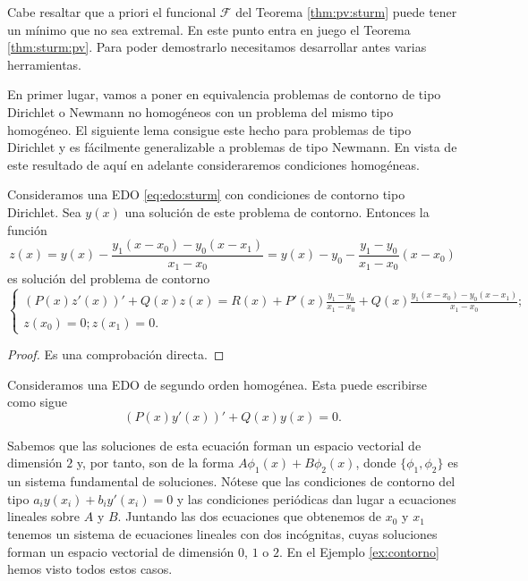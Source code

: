 \documentclass{article}
\begin{document}
Cabe resaltar que a priori el funcional $\mathcal{F}$ del Teorema \ref{thm:pv:sturm} puede tener un
mínimo que no sea extremal. En este punto entra en juego el Teorema \ref{thm:sturm:pv}. Para poder
demostrarlo necesitamos desarrollar antes varias herramientas.


En primer lugar, vamos a poner en equivalencia problemas de contorno de tipo Dirichlet o Newmann no
homogéneos con un problema del mismo tipo homogéneo. El siguiente lema consigue este hecho para
problemas de tipo Dirichlet y es fácilmente generalizable a problemas de tipo Newmann. En vista de
este resultado de aquí en adelante consideraremos condiciones homogéneas.


\begin{lemma} \label{lem:pc:hom} Consideramos una EDO \eqref{eq:edo:sturm} con condiciones de
  contorno tipo Dirichlet. Sea $y(x)$ una solución de este problema de contorno. Entonces la función
  \[ z(x) = y(x) - \frac{y_1(x-x_0) - y_0(x-x_1)}{x_1- x_0} = y(x) - y_0 - \frac{y_1 - y_0}{x_1-
      x_0}(x-x_0) \] es solución del problema de contorno
  \[
    \begin{cases}
      (P(x)z'(x))' + Q(x)z(x) = R(x) + P'(x) \frac{y_1 - y_0}{x_1- x_0} + Q(x)  \frac{y_1(x-x_0) - y_0(x-x_1)}{x_1- x_0}; \\
      z(x_0) = 0; z(x_1) = 0.
    \end{cases}
  \]
\end{lemma}
\begin{proof}
  Es una comprobación directa.
\end{proof}

Consideramos una EDO de segundo orden homogénea. Esta puede escribirse como sigue
\begin{equation}
  \label{eq:sturm:eh}
  (P(x)y'(x))' + Q(x)y(x) = 0.
  \tag{SH}
\end{equation}

Sabemos que las soluciones de esta ecuación forman un espacio vectorial de dimensión $2$ y, por
tanto, son de la forma $A \phi_1(x) + B \phi_2(x)$, donde $\{\phi_1, \phi_2\}$ es un sistema
fundamental de soluciones. Nótese que las condiciones de contorno del tipo
$a_i y(x_i) + b_i y'(x_i) = 0$ y las condiciones periódicas dan lugar a ecuaciones lineales sobre
$A$ y $B$. Juntando las dos ecuaciones que obtenemos de $x_0$ y $x_1$ tenemos un sistema de
ecuaciones lineales con dos incógnitas, cuyas soluciones forman un espacio vectorial de dimensión
$0$, $1$ o $2$. En el Ejemplo \ref{ex:contorno} hemos visto todos estos casos.
\end{document}
